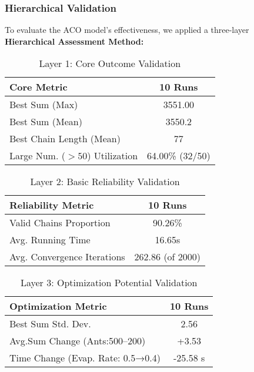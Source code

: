 \documentclass[twocolumn, a4paper]{article}
\begin{document}
\subsubsection{Hierarchical Validation}
To evaluate the ACO model's effectiveness, we applied a three-layer \textbf{Hierarchical Assessment Method:}
\begin{table}[htbp]
  \centering
  \setlength{\tabcolsep}{4pt} %
  \caption{Layer 1: Core Outcome Validation}
  \begin{tabular}{@{}lc@{}} %
    \toprule
    \textbf{Core Metric}         & \textbf{10 Runs} \\
    \midrule
    Best Sum (Max)               & 3551.00 \\
    Best Sum (Mean)              & 3550.2 \\
    Best Chain Length (Mean)     & 77 \\
    Large Num. ($>50$) Utilization & 64.00\% (32/50) \\
    \bottomrule
  \end{tabular}
\label{tab:core}
\end{table}
\begin{table}[htbp]
  \centering
  \setlength{\tabcolsep}{4pt}
  \caption{Layer 2: Basic Reliability Validation}
  \begin{tabular}{@{}lc@{}}
    \toprule
    \textbf{Reliability Metric}   & \textbf{10 Runs} \\
    \midrule
    Valid Chains Proportion       & 90.26\% \\
    Avg. Running Time             & 16.65s \\
    Avg. Convergence Iterations   & 262.86 (of 2000) \\
    \bottomrule
  \end{tabular}
\label{tab:reliability}
\end{table}
\begin{table}[H]
  \centering
  \setlength{\tabcolsep}{4pt}
  \caption{Layer 3: Optimization Potential Validation}
  \begin{tabular}{@{}lc@{}}
    \toprule
    \textbf{Optimization Metric}             & \textbf{10 Runs} \\
    \midrule
    Best Sum Std. Dev.                       & 2.56 \\
    Avg.Sum Change (Ants:500--200)            & +3.53  \\
    Time Change (Evap. Rate: 0.5→0.4)        & -25.58 s \\
    \bottomrule
  \end{tabular}
\label{tab:optimization}
\end{table}
\end{document}
